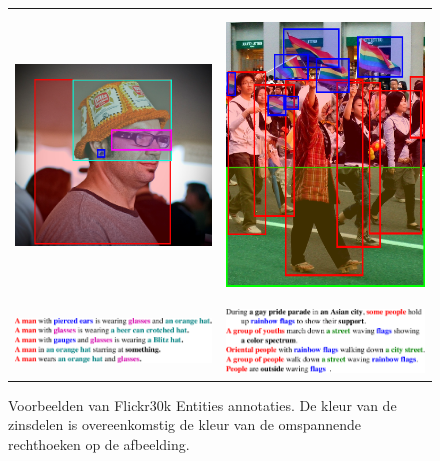 \begin{figure}[!tb]
    \centering
    \begin{tabular}[t]{cc}
      \includegraphics[height=3.0in]{Images/example_hat.png} \vspace{-3mm}&
      \includegraphics[height=3.0in]{Images/example_parade.png}\\
      \includegraphics[valign = T,width=.4\columnwidth]{Images/example_hat_text.pdf}&
      \includegraphics[valign = T,width=.4\columnwidth]{Images/example_parade_text.pdf}
  \end{tabular}
\caption{Voorbeelden van Flickr30k Entities annotaties. De kleur van de zinsdelen is overeenkomstig de kleur van de omspannende rechthoeken op de afbeelding\cite{Plummer2015}.}
\label{fig:entities}
\end{figure}

